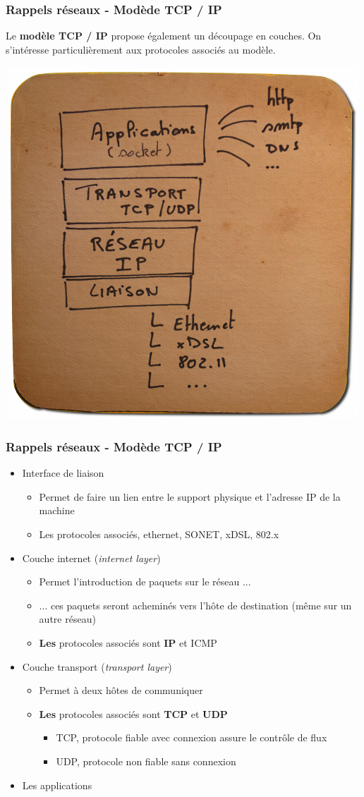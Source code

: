 \begin{frame}[fragile]
  \frametitle{Rappels réseaux - Modède TCP / IP}
Le \textbf{modèle TCP / IP} propose également un découpage en couches. On s'intéresse particulièrement aux protocoles associés au modèle.

\begin{center}
	\includegraphics[width=.55\linewidth]{img/modele-tcpip-500x500.png}
\end{center}
\end{frame}

\begin{frame}[fragile]
  \frametitle{Rappels réseaux - Modède TCP / IP}
\begin{itemize}
	\item Interface de liaison
	\begin{itemize}
		\item Permet de faire un lien entre le support physique et l'adresse IP de la machine
		\item Les protocoles associés, ethernet, SONET, xDSL, 802.x
	\end{itemize}
	\item Couche internet (\textit{internet layer})
	\begin{itemize}
		\item Permet l'introduction de paquets sur le réseau ...
		\item ... ces paquets seront acheminés vers l'hôte de destination (même sur un autre réseau)
		\item \textbf{Les} protocoles associés sont \textbf{IP} et ICMP
	\end{itemize}
	\item Couche transport (\textit{transport layer})
	\begin{itemize}
		\item Permet à deux hôtes de communiquer
		\item \textbf{Les} protocoles associés sont \textbf{TCP} et \textbf{UDP}
		\begin{itemize}
			\item TCP, protocole fiable avec connexion assure le contrôle de flux
			\item UDP, protocole non fiable sans connexion
		\end{itemize}
	\end{itemize}
	\item Les applications
\end{itemize}
\end{frame}


